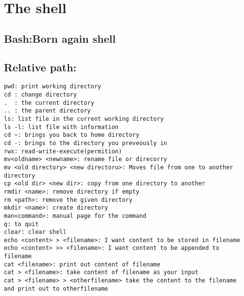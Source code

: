 \documentclass[10pt,a4paper,twoside]{article} %
\begin{document}

\section*{The shell}
\subsection*{Bash:Born again shell}
\subsection*{Relative path:}
\begin{verbatim}
pwd: print working directory
cd : change directory
.  : the current directory
.. : the parent directory
ls: list file in the current working directory
ls -l: list file with information
cd ~: brings you back to home directory
cd -: brings to the directory you preveously in
rwx: read-write-execute(permition)
mv<oldname> <newname>: rename file or direcorry 
mv <old directory> <new directoru>: Moves file from one to another directory
cp <old dir> <new dir>: copy from one directory to another
rmdir <name>: remove directory if empty
rm <path>: remove the given directory
mkdir <name>: create directory
man<command>: manual page for the command
q: to quit
clear: clear shell
echo <content> > <filename>: I want content to be stored in filename
echo <content> >> <filename>: I want content to be appended to filename
cat <filename>: print out content of filename
cat > <filename>: take content of filename as your input 
cat > <filename> > <otherfilename> take the content to the filename and print out to otherfilename

\end{verbatim}
\end{document}
